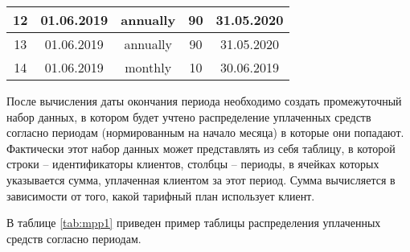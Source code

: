 \begin{table}[H]
{\begin{tabular}{|c|c|c|c|c|}
			12                    & 01.06.2019             & annually            & 90                    & 31.05.2020           \\ \hline
			13                    & 01.06.2019             & annually            & 90                    & 31.05.2020           \\ \hline
			14                    & 01.06.2019             & monthly             & 10                    & 30.06.2019           \\ \hline
		\end{tabular}%
	}
\end{table}

После вычисления даты окончания периода необходимо создать промежуточный набор данных, в котором будет учтено распределение уплаченных средств согласно периодам (нормированным на начало месяца) в которые они попадают. Фактически этот набор данных может представлять из себя таблицу, в которой строки -- идентификаторы клиентов, столбцы -- периоды, в ячейках которых указывается сумма, уплаченная клиентом за этот период. Сумма вычисляется в зависимости от того, какой тарифный план использует клиент. 

В таблице \ref{tab:mpp1} приведен пример таблицы распределения уплаченных средств согласно периодам.

